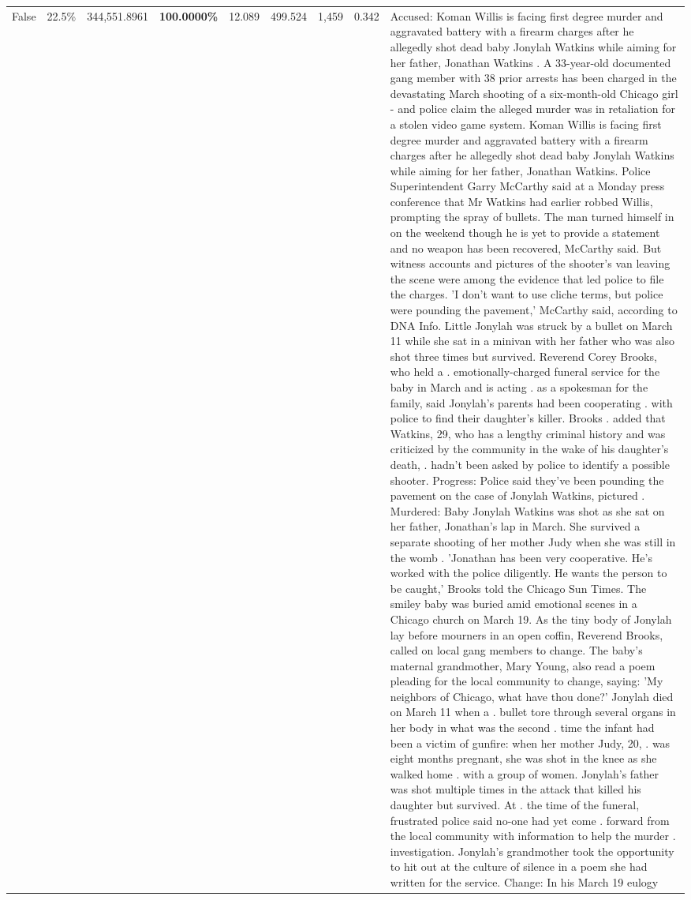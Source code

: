 \begin{table}[H]
\begin{tabular}{lllrlllll}
False & 22.5\% & 344,551.8961 & \bfseries \color{red} 100.0000\% & 12.089 & 499.524 & 1,459 & 0.342 & Accused: Koman Willis is facing first degree murder and aggravated battery with a firearm charges after he allegedly shot dead baby Jonylah Watkins while aiming for her father, Jonathan Watkins . A 33-year-old documented gang member with 38 prior arrests has been charged in the devastating March shooting of a six-month-old Chicago girl - and police claim the alleged murder was in retaliation for a stolen video game system. Koman Willis is facing first degree murder and aggravated battery with a firearm charges after he allegedly shot dead baby Jonylah Watkins while aiming for her father, Jonathan Watkins. Police Superintendent Garry McCarthy said at a Monday press conference that Mr Watkins had earlier robbed Willis, prompting the spray of bullets. The man turned himself in on the weekend though he is yet to provide a statement and no weapon has been recovered, McCarthy said. But witness accounts and pictures of the shooter's van leaving the scene were among the evidence that led police to file the charges. 'I don't want to use cliche terms, but police were pounding the pavement,' McCarthy said, according to DNA Info. Little Jonylah was struck by a bullet on March 11 while she sat in a minivan with her father who was also shot three times but survived. Reverend Corey Brooks, who held a . emotionally-charged funeral service for the baby in March and is acting . as a spokesman for the family, said Jonylah's parents had been cooperating . with police to find their daughter's killer. Brooks . added that Watkins, 29, who has a lengthy criminal history and was criticized by the community in the wake of his daughter's death, . hadn't been asked by police to identify a possible shooter. Progress: Police said they've been pounding the pavement on the case of Jonylah Watkins, pictured . Murdered: Baby Jonylah Watkins was shot as she sat on her father, Jonathan's lap in March. She survived a separate shooting of her mother Judy when she was still in the womb . 'Jonathan has been very cooperative. He's worked with the police diligently. He wants the person to be caught,' Brooks told the Chicago Sun Times. The smiley baby was buried amid emotional scenes in a Chicago church on March 19. As the tiny body of Jonylah lay before mourners in an open coffin, Reverend Brooks, called on local gang members to change. The baby's maternal grandmother, Mary Young, also read a poem pleading for the local community to change, saying: 'My neighbors of Chicago, what have thou done?' Jonylah died on March 11 when a . bullet tore through several organs in her body in what was the second . time the infant had been a victim of gunfire: when her mother Judy, 20, . was eight months pregnant, she was shot in the knee as she walked home . with a group of women. Jonylah's father was shot multiple times in the attack that killed his daughter but survived. At . the time of the funeral, frustrated police said no-one had yet come . forward from the local community with information to help the murder . investigation. Jonylah's grandmother took the opportunity to hit out at the culture of silence in a poem she had written for the service. Change: In his March 19 eulogy 
\end{tabular}
\end{table}
